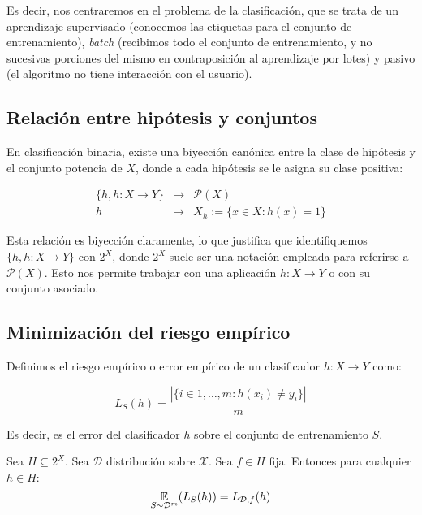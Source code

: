 Es decir, nos centraremos en el problema de la clasificación, que se trata de un aprendizaje supervisado (conocemos las etiquetas para
el conjunto de entrenamiento), \emph{batch} (recibimos todo el conjunto de entrenamiento, y no sucesivas porciones del mismo en
contraposición al aprendizaje por lotes) y pasivo (el algoritmo no tiene interacción con el usuario).

\subsection{Relación entre hipótesis y conjuntos}
\label{biyeccion-canonica} 
En clasificación binaria, existe una biyección canónica entre la clase de hipótesis y el conjunto potencia de $X$, donde
a cada hipótesis se le asigna su clase positiva:

\begin{equation*}
 \begin{array}{rcl} 
  \{h, h:X \rightarrow Y\} & \longrightarrow & \mathcal{P}(X) \\
  h & \longmapsto & X_h := \{x\in X: h(x) = 1\}
 \end{array}
\end{equation*}

Esta relación es biyección claramente, lo que justifica que identifiquemos $\{h, h:X \rightarrow Y\}$ con $2^X$, donde $2^X$ 
suele ser una notación empleada para referirse a $\mathcal{P}(X)$. Esto nos permite trabajar con una aplicación
$h:X \rightarrow Y$ o con su conjunto asociado.

\subsection{Minimización del riesgo empírico}

\begin{definition}
Definimos el riesgo empírico o error empírico de un clasificador $h:X \rightarrow Y$ como:

\[L_S(h) = \frac{|\{i\in {1,\ldots, m}: h(x_i) \neq y_i\}|}{m}\]

\end{definition}

Es decir, es el error del clasificador $h$ sobre el conjunto de entrenamiento $S$. 

\begin{fact}
Sea $H\subseteq 2^X$. Sea $\mathcal{D}$ distribución sobre $\mathcal{X}$. Sea $f \in H$ fija. Entonces para
cualquier $h\in H$:
\[\underset{S\sim \mathcal{D}^m}{\mathbb{E}}(L_S(h)) = L_{\mathcal{D},f}(h)\]

\end{fact}

